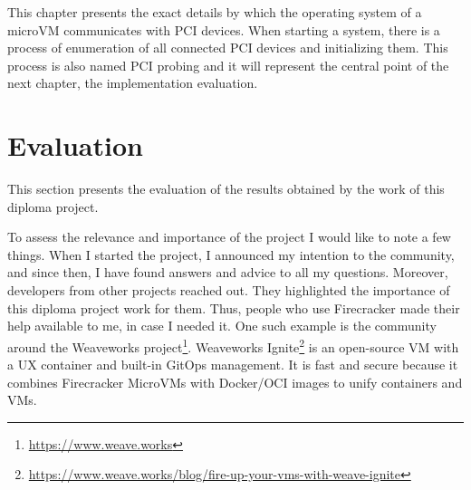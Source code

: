 \documentclass[12pt, a4paper]{report}
\begin{document}
This chapter presents the exact details by which the operating system of a microVM communicates with PCI devices. When starting a system, there is a process of enumeration of all connected PCI devices and initializing them. This process is also named PCI probing and it will represent the central point of the next chapter, the implementation evaluation.

\chapter{Evaluation}\label{Evaluation}

This section presents the evaluation of the results obtained by the work of this diploma project.

To assess the relevance and importance of the project I would like to note a few things. When I started the project, I announced my intention to the community, and since then, I have found answers and advice to all my questions. Moreover, developers from other projects reached out. They highlighted the importance of this diploma project work for them. Thus, people who use Firecracker made their help available to me, in case I needed it.  One such example is the community around the Weaveworks project\footnote{\url{https://www.weave.works}}. Weaveworks Ignite\footnote{\url{https://www.weave.works/blog/fire-up-your-vms-with-weave-ignite}} is an open-source VM with a UX container and built-in GitOps management. It is fast and secure because it combines Firecracker MicroVMs with Docker/OCI images to unify containers and VMs.
\end{document}
